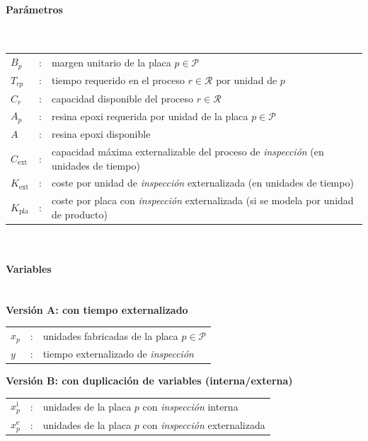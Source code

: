 \paragraph{Parámetros}\mbox{}\\
\begin{tabular}{l c l}
    $B_p$           & : & margen unitario de la placa $p \in \mathcal{P}$ \\
    $T_{rp}$        & : & tiempo requerido en el proceso $r \in \mathcal{R}$ por unidad de $p$ \\
    $C_r$           & : & capacidad disponible del proceso $r \in \mathcal{R}$ \\
    $A_p$           & : & resina epoxi requerida por unidad de la placa $p \in \mathcal{P}$ \\
    $A$             & : & resina epoxi disponible \\
    $C_{\mathrm{ext}}$ & : & capacidad máxima externalizable del proceso de \emph{inspección} (en unidades de tiempo) \\
    $K_{\mathrm{ext}}$ & : & coste por unidad de \emph{inspección} externalizada (en unidades de tiempo) \\
    $K_{\mathrm{pla}}$ & : & coste por placa con \emph{inspección} externalizada (si se modela por unidad de producto) \\
\end{tabular}
\\[0.25cm]

\paragraph{Variables}\mbox{}\\
\textbf{Versión A: con tiempo externalizado}\\
\begin{tabular}{l c l}
    $x_p$ & : & unidades fabricadas de la placa $p \in \mathcal{P}$ \\
    $y$   & : & tiempo externalizado de \emph{inspección} \\
\end{tabular}

\noindent\textbf{Versión B: con duplicación de variables (interna/externa)}\\
\begin{tabular}{l c l}
    $x_p^{\mathrm{i}}$ & : & unidades de la placa $p$ con \emph{inspección} interna \\
    $x_p^{\mathrm{e}}$ & : & unidades de la placa $p$ con \emph{inspección} externalizada \\
\end{tabular}
\\[0.25cm]

